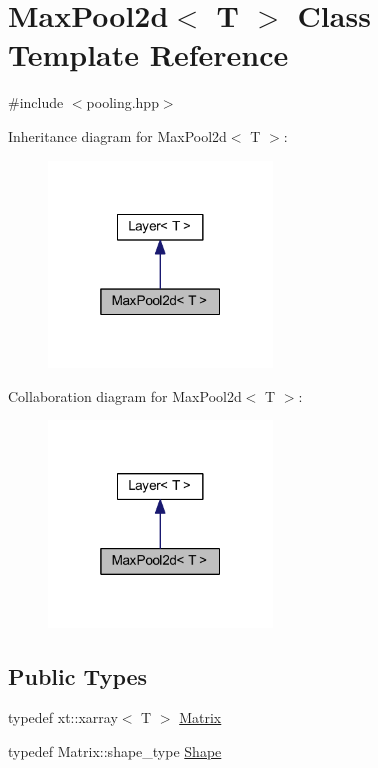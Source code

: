 \hypertarget{class_max_pool2d}{}\section{Max\+Pool2d$<$ T $>$ Class Template Reference}
\label{class_max_pool2d}


{\ttfamily \#include $<$pooling.\+hpp$>$}



Inheritance diagram for Max\+Pool2d$<$ T $>$\+:\nopagebreak
\begin{figure}[H]
\begin{center}
\leavevmode
\includegraphics[width=169pt]{class_max_pool2d__inherit__graph}
\end{center}
\end{figure}


Collaboration diagram for Max\+Pool2d$<$ T $>$\+:\nopagebreak
\begin{figure}[H]
\begin{center}
\leavevmode
\includegraphics[width=169pt]{class_max_pool2d__coll__graph}
\end{center}
\end{figure}
\subsection*{Public Types}
\begin{DoxyCompactItemize}
\item 
typedef xt\+::xarray$<$ T $>$ \mbox{\hyperlink{class_max_pool2d_a8e701daf0dfb0e61e36eec865297a4e9}{Matrix}}
\item 
typedef Matrix\+::shape\+\_\+type \mbox{\hyperlink{class_max_pool2d_ad70f776b32f3a19af78573b634d00072}{Shape}}
\end{DoxyCompactItemize}
